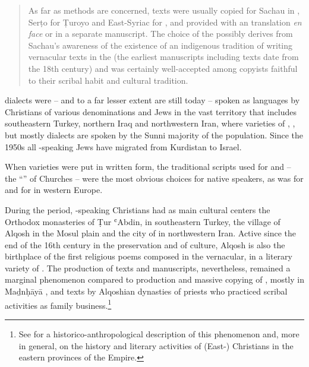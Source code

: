 \documentclass[output=paper,colorlinks,citecolor=brown,arabfont,syriacfont]{langscibook}
\begin{document}
\begin{quote}
As far as methods are concerned,  texts were usually copied for Sachau in  , Serṭo for Ṭuroyo and East-Syriac  for , and provided with an  translation \textit{en face} or in a separate manuscript. The choice of the   possibly derives from Sachau's awareness of the existence of an indigenous tradition of writing vernacular texts in the   (the earliest manuscripts including  texts date from the 18th century) and was certainly well-accepted among copyists faithful to their scribal habit and cultural tradition. \citep[424]{bellino_mengozzi2016}
\end{quote}

 dialects were -- and to a far lesser extent are still today -- spoken as  languages by Christians of various denominations and Jews in the vast territory that includes southeastern Turkey, northern Iraq and northwestern Iran, where varieties of , , but mostly  dialects are spoken by the Sunni majority of the population. Since the 1950s all -speaking Jews have migrated from Kurdistan to Israel.

When  varieties were put in written form, the traditional scripts used for  and  -- the ``'' of  Churches -- were the most obvious choices for native speakers, as   was for  and  for  in western Europe. 

During the  period, -speaking Christians had as main cultural centers the  Orthodox monasteries of Ṭur ʿAbdin, in southeastern Turkey, the village of Alqosh in the Mosul plain and the city of  in northwestern Iran. Active since the end of the 16th century in the preservation and  of  culture, Alqosh is also the birthplace of the first religious poems composed in the vernacular, in a literary variety of . The production of  texts and manuscripts, nevertheless, remained a marginal phenomenon compared to production and massive copying of , mostly in Maḏnḥāyā , and  texts by Alqoshian dynasties of priests who practiced scribal activities as family business.\footnote{%
See \citet{murre-van_den_berg2015} for a historico-anthropological description of this phenomenon and, more in general, on the history and literary activities of (East-) Christians in the eastern provinces of the  Empire.}
\end{document}
